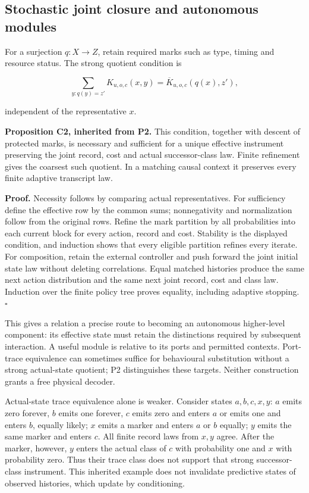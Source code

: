 \documentclass[
  11pt,
  a4paper,
]{article}
\begin{document}
\subsection{Stochastic joint closure and autonomous
modules}\label{stochastic-joint-closure-and-autonomous-modules}

For a surjection \(q:X\to Z\), retain required marks such as type,
timing and resource status. The strong quotient condition is

\[
\sum_{y:q(y)=z'}K_{u,o,c}(x,y)=\overline K_{u,o,c}(q(x),z'),
\]

independent of the representative \(x\).

\textbf{Proposition C2, inherited from P2.} This condition, together
with descent of protected marks, is necessary and sufficient for a
unique effective instrument preserving the joint record, cost and actual
successor-class law. Finite refinement gives the coarsest such quotient.
In a matching causal context it preserves every finite adaptive
transcript law.

\textbf{Proof.} Necessity follows by comparing actual representatives.
For sufficiency define the effective row by the common sums;
nonnegativity and normalization follow from the original rows. Refine
the mark partition by all probabilities into each current block for
every action, record and cost. Stability is the displayed condition, and
induction shows that every eligible partition refines every iterate. For
composition, retain the external controller and push forward the joint
initial state law without deleting correlations. Equal matched histories
produce the same next action distribution and the same next joint
record, cost and class law. Induction over the finite policy tree proves
equality, including adaptive stopping. \(\square\)

This gives a relation a precise route to becoming an autonomous
higher-level component: its effective state must retain the distinctions
required by subsequent interaction. A useful module is relative to its
ports and permitted contexts. Port-trace equivalence can sometimes
suffice for behavioural substitution without a strong actual-state
quotient; P2 distinguishes these targets. Neither construction grants a
free physical decoder.

Actual-state trace equivalence alone is weaker. Consider states
\(a,b,c,x,y\): \(a\) emits zero forever, \(b\) emits one forever, \(c\)
emits zero and enters \(a\) or emits one and enters \(b\), equally
likely; \(x\) emits a marker and enters \(a\) or \(b\) equally; \(y\)
emits the same marker and enters \(c\). All finite record laws from
\(x,y\) agree. After the marker, however, \(y\) enters the actual class
of \(c\) with probability one and \(x\) with probability zero. Thus
their trace class does not support that strong successor-class
instrument. This inherited example does not invalidate predictive states
of observed histories, which update by conditioning.
\end{document}
